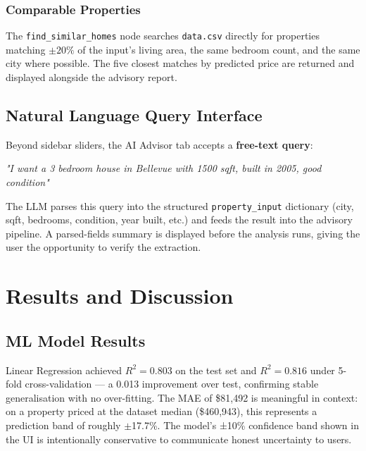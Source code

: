 \documentclass[12pt, a4paper]{article}
\begin{document}
\subsubsection{Comparable Properties}
The \texttt{find\_similar\_homes} node searches \texttt{data.csv} directly for
properties matching $\pm 20\%$ of the input's living area, the same bedroom count,
and the same city where possible. The five closest matches by predicted price are
returned and displayed alongside the advisory report.

\subsection{Natural Language Query Interface}

Beyond sidebar sliders, the AI Advisor tab accepts a \textbf{free-text query}:

\begin{center}
\textit{"I want a 3 bedroom house in Bellevue with 1500 sqft, built in 2005, good condition"}
\end{center}

The LLM parses this query into the structured \texttt{property\_input} dictionary
(city, sqft, bedrooms, condition, year built, etc.) and feeds the result into the
advisory pipeline. A parsed-fields summary is displayed before the analysis runs,
giving the user the opportunity to verify the extraction.

\section{Results and Discussion}

\subsection{ML Model Results}

Linear Regression achieved $R^2 = 0.803$ on the test set and $R^2 = 0.816$ under
5-fold cross-validation --- a 0.013 improvement over test, confirming stable
generalisation with no over-fitting. The MAE of \$81,492 is meaningful in context:
on a property priced at the dataset median (\$460,943), this represents a prediction
band of roughly $\pm$17.7\%. The model's ±10\% confidence band shown in the UI is
intentionally conservative to communicate honest uncertainty to users.
\end{document}
